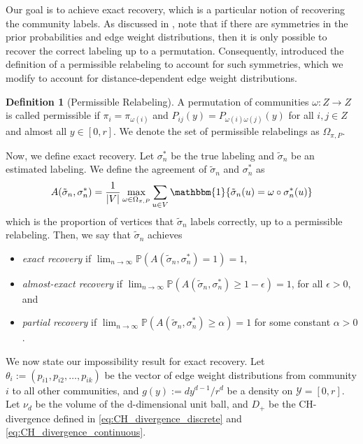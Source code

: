 \documentclass{article}
\renewcommand{\P}{\mathbb{P}}
\newcommand{\1}{\mathbbm{1}}
\newcommand{\calY}{\mathcal{Y}}
\theoremstyle{definition}
\newtheorem{definition}{Definition}
\theoremstyle{plain}
\begin{document}
Our goal is to achieve exact recovery, which is a particular notion of recovering the community labels. As discussed in \cite{Gaudio+2025}, note that if there are symmetries in the prior probabilities and edge weight distributions, then it is only possible to recover the correct labeling up to a permutation. Consequently, \cite{Gaudio+2025} introduced the definition of a permissible relabeling to account for such symmetries, which we modify to account for distance-dependent edge weight distributions. 
\begin{definition}[Permissible Relabeling]
A permutation of communities $\omega: Z \to Z$ is called permissible if $\pi_i = \pi_{\omega(i)}$ and $P_{ij}(y) = P_{\omega(i)\omega(j)}(y)$ for all $i, j \in Z$ and almost all $y \in [0, r]$. We denote the set of permissible relabelings as $\Omega_{\pi, P}$.
\end{definition}
Now, we define exact recovery. Let $\sigma^*_n$ be the true labeling and $\tilde{\sigma}_n$ be an estimated labeling. We define the agreement of $\tilde{\sigma}_n$ and $\sigma^*_n$ as
\begin{equation*}
    A(\tilde{\sigma}_n, \sigma^*_n) = \frac{1}{|V|} \max_{\omega \in \Omega_{\pi, P}} \sum_{u \in V} \1\{\tilde{\sigma}_n(u) = \omega \circ \sigma^*_n(u)\}
\end{equation*}
which is the proportion of vertices that $\tilde{\sigma}_n$ labels correctly, up to a permissible relabeling. Then, we say that $\tilde{\sigma}_n$ achieves
\begin{itemize}
    \item \textit{exact recovery} if $\lim_{n \to \infty} \P(A(\tilde{\sigma}_n, \sigma^*_n) = 1) = 1$,
    \item \textit{almost-exact recovery} if $\lim_{n \to \infty} \P(A(\tilde{\sigma}_n, \sigma^*_n) \geq 1 - \epsilon) = 1$, for all $\epsilon > 0$, and
    \item \textit{partial recovery} if $\lim_{n \to \infty} \P(A(\tilde{\sigma}_n, \sigma^*_n) \geq \alpha) = 1$ for some constant $\alpha > 0$.
\end{itemize}



We now state our impossibility result for exact recovery. Let $\theta_i := (p_{i1}, p_{i2}, \ldots, p_{ik})$ be the vector of edge weight distributions from community $i$ to all other communities, and $g(y) := dy^{d-1}/r^d$ be a density on $\calY = [0, r]$. Let $\nu_d$ be the volume of the d-dimensional unit ball, and $D_+$ be the CH-divergence defined in \eqref{eq:CH_divergence_discrete} and \eqref{eq:CH_divergence_continuous}.
\end{document}
